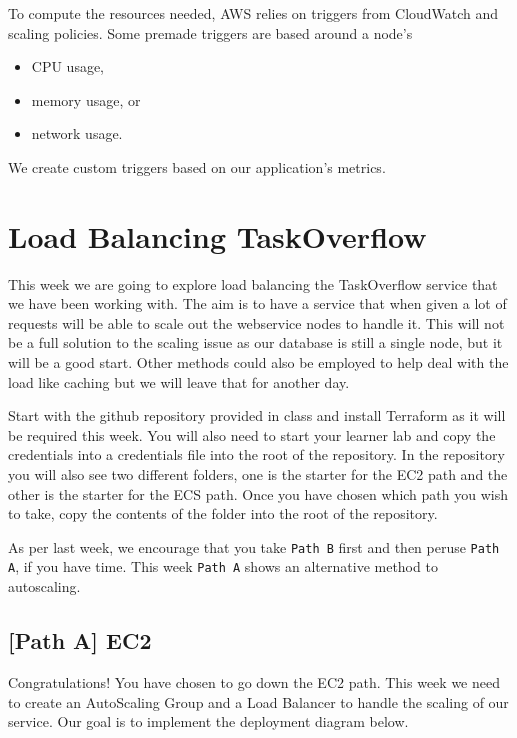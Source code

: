 \documentclass{csse4400}
\begin{document}
To compute the resources needed, AWS relies on triggers from CloudWatch and scaling policies.
Some premade triggers are based around a node's

\begin{itemize}
    \item CPU usage,
    \item memory usage, or 
    \item network usage.
\end{itemize}

We create custom triggers based on our application's metrics.

\section{Load Balancing TaskOverflow}

This week we are going to explore load balancing the TaskOverflow service that we have been working with. The aim is to have a service that when given a lot of requests will be able to scale out the webservice nodes to handle it. This will not be a full solution to the scaling issue as our database is still a single node, but it will be a good start. Other methods could also be employed to help deal with the load like caching but we will leave that for another day.

Start with the github repository provided in class and install Terraform as it will be required this week. You will also need to start your learner lab and copy the credentials into a credentials file into the root of the repository. In the repository you will also see two different folders, one is the starter for the EC2 path and the other is the starter for the ECS path. Once you have chosen which path you wish to take, copy the contents of the folder into the root of the repository.

As per last week, we encourage that you take \texttt{Path B} first and then peruse \texttt{Path A}, if you have time.
This week \texttt{Path A} shows an alternative method to autoscaling.

\subsection{[Path A] EC2}

Congratulations! You have chosen to go down the EC2 path. This week we need to create an AutoScaling Group and a Load Balancer to handle the scaling of our service. Our goal is to implement the deployment diagram below.
\end{document}
